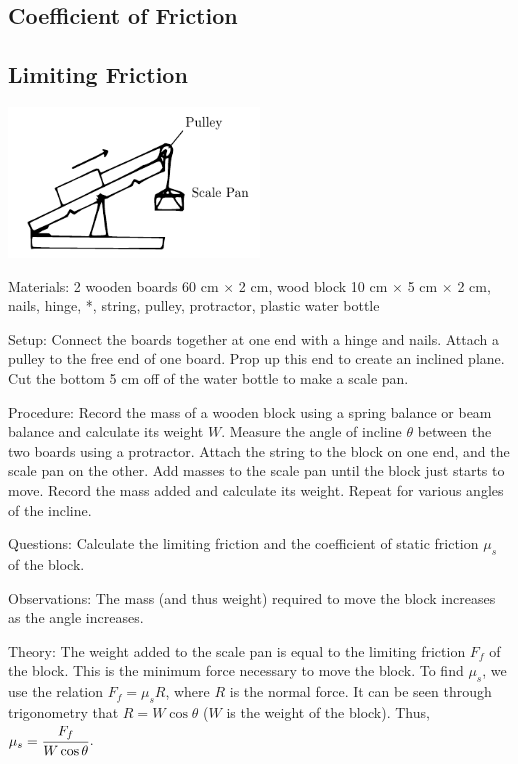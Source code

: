 \begin{multicols}{2}

\section*{Coefficient of Friction}


\subsection{Limiting Friction}

\begin{center}
\includegraphics[width=0.5\textwidth]{./img/limiting-friction.png}
\end{center}

\begin{description*}
\item[Materials:]{2 wooden boards 60 cm $\times$ 2 cm, wood block 10 cm $\times$ 5 cm $\times$ 2 cm, nails, hinge, *, string, pulley, protractor, plastic water bottle}
\item[Setup:]{Connect the boards together at one end with a hinge and nails. Attach a pulley to the free end of one board. Prop up this end to create an inclined plane. Cut the bottom 5 cm off of the water bottle to make a scale pan.}
\item[Procedure:]{Record the mass of a wooden block using a spring balance or beam balance and calculate its weight $W$. Measure the angle of incline $\theta$ between the two boards using a protractor. Attach the string to the block on one end, and the scale pan on the other. Add masses to the scale pan until the block just starts to move. Record the mass added and calculate its weight. Repeat for various angles of the incline.}
\item[Questions:]{Calculate the limiting friction and the coefficient of static friction $\mu_s$ of the block.}
\item[Observations:]{The mass (and thus weight) required to move the block increases as the angle increases.}
\item[Theory:]{The weight added to the scale pan is equal to the limiting friction $F_f$ of the block. This is the minimum force necessary to move the block. To find $\mu_s$, we use the relation $F_f=\mu_s R$, where $R$ is the normal force. It can be seen through trigonometry that $R=W\cos{\theta}$ ($W$ is the weight of the block). Thus, $\mu_s=\cfrac{F_f}{W\cos{\theta}}$.}
\end{description*}


\end{multicols}
